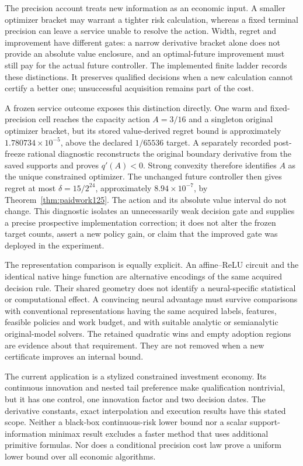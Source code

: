 The precision account treats new information as an economic input. A
smaller optimizer bracket may warrant a tighter risk calculation, whereas
a fixed terminal precision can leave a service unable to resolve the
action. Width, regret and improvement have different gates: a narrow
derivative bracket alone does not provide an absolute value enclosure,
and an optimal-future improvement must still pay for the actual future
controller. The implemented finite ladder records these distinctions.
It preserves qualified decisions when a new calculation cannot certify
a better one; unsuccessful acquisition remains part of the cost.


A frozen service outcome exposes this distinction directly. One warm
and fixed-precision cell reaches the capacity action $A=3/16$ and a
singleton original optimizer bracket, but its stored value-derived regret
bound is approximately $1.780734\times10^{-5}$, above the declared
$1/65536$ target. A separately recorded post-freeze rational diagnostic
reconstructs the original boundary derivative from the saved supports and
proves $q'(A)<0$. Strong convexity therefore identifies $A$ as the unique
constrained optimizer. The unchanged future controller then gives regret
at most $\delta=15/2^{24}$, approximately $8.94\times10^{-7}$, by
Theorem~\ref{thm:paidwork125}. The action and its absolute value interval
do not change. This diagnostic isolates an unnecessarily weak decision
gate and supplies a precise prospective implementation correction; it does
not alter the frozen target counts, assert a new policy gain, or claim
that the improved gate was deployed in the experiment.

The representation comparison is equally explicit. An affine--ReLU circuit
and the identical native hinge function are alternative encodings of the
same acquired decision rule. Their shared geometry does not identify a
neural-specific statistical or computational effect. A convincing neural
advantage must survive comparisons with conventional representations
having the same acquired labels, features, feasible policies and work
budget, and with suitable analytic or semianalytic original-model solvers.
The retained quadratic wins and empty adoption regions are evidence about
that requirement. They are not removed when a new certificate improves
an internal bound.

The current application is a stylized constrained investment economy.
Its continuous innovation and nested tail preference make qualification
nontrivial, but it has one control, one innovation factor and two decision
dates. The derivative constants, exact interpolation and execution results
have this stated scope. Neither a black-box continuous-risk lower bound
nor a scalar support-information minimax result excludes a faster method
that uses additional primitive formulas. Nor does a conditional precision
cost law prove a uniform lower bound over all economic algorithms.

